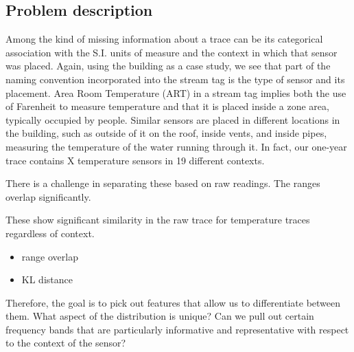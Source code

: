 
\subsection{Problem description}
Among the kind of missing information about a trace can be its categorical association with the S.I. units of measure
and the context in which that sensor was placed.  Again, using the building as a case study, we see that part of the 
naming convention incorporated into the stream tag is the type of sensor and its placement.  Area Room Temperature (ART)
in a stream tag implies both the use of Farenheit to measure temperature and that it is placed inside a zone area,
typically occupied by people.  Similar sensors are placed in different locations in the building, such as outside of it
on the roof, inside vents, and inside pipes, measuring the temperature of the water running through it.  In fact, our
one-year trace contains X temperature sensors in 19 different contexts.

There is a challenge in separating these based on raw readings.  The ranges overlap significantly.

These show significant similarity in the raw trace for temperature traces regardless of context.
\begin{itemize}
\item range overlap
\item KL distance
\end{itemize}

Therefore, the goal is to pick out features that allow us to differentiate between them.  What aspect of the distribution is unique?
Can we pull out certain frequency bands that are particularly informative and representative with respect to the context of
the sensor?

